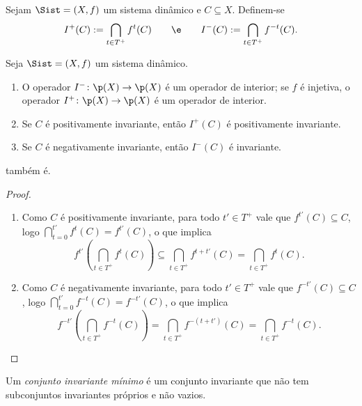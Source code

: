 
\begin{definition}
Sejam $\Sist=(X,f)$ um sistema dinâmico e $C \subseteq X$. Definem-se
	\begin{equation*}
	I^+(C) := \bigcap_{t \in T^+}f^t(C) \qquad\e\qquad I^-(C) := \bigcap_{t \in T^+} f^{-t}(C).
	\end{equation*}
\end{definition}

\begin{proposition}
Seja $\Sist=(X,f)$ um sistema dinâmico.
	\begin{enumerate}
	\item O operador $I^-\colon \p(X) \to \p(X)$ é um operador de interior; se $f$ é injetiva, o operador $I^+\colon \p(X) \to \p(X)$ é um operador de interior.
	\item Se $C$ é positivamente invariante, então $I^+(C)$ é positivamente invariante.
	\item Se $C$ é negativamente invariante, então $I^-(C)$ é invariante.
	\end{enumerate}
também é.
\end{proposition}
\begin{proof}
	\begin{enumerate}
	\item Como $C$ é positivamente invariante, para todo $t' \in T^+$ vale que $f^{t'}(C) \subseteq C$, logo $\bigcap_{t=0}^{t'}f^t(C) = f^{t'}(C)$, o que implica
		\begin{equation*}
		f^{t'}\left( \bigcap_{t \in T^+} f^t(C) \right) \subseteq \bigcap_{t \in T^+} f^{t+t'}(C) = \bigcap_{t \in T^+} f^t(C).
		\end{equation*}
	\item Como $C$ é negativamente invariante, para todo $t' \in T^+$ vale que $f^{-t'}(C) \subseteq C$, logo $\bigcap_{t=0}^{t'}f^{-t}(C) = f^{-t'}(C)$, o que implica
		\begin{equation*}
		f^{-t'}\left( \bigcap_{t \in T^+} f^{-t}(C) \right) = \bigcap_{t \in T^+} f^{-(t+t')}(C) = \bigcap_{t \in T^+} f^{-t}(C).
		\end{equation*}
	\end{enumerate}
\end{proof}


\begin{definition}
Um \emph{conjunto invariante mínimo} é um conjunto invariante que não tem subconjuntos invariantes próprios e não vazios.
\end{definition}


